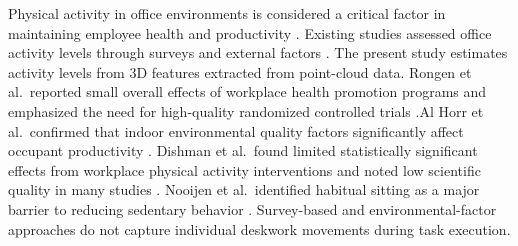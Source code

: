 Physical activity in office environments is considered a critical factor in maintaining employee health and productivity \cite{PAPAGIANNIDIS2020102027}.
Existing studies assessed office activity levels through surveys and external factors \cite{RONGEN2013406,ALHORR2016369,DISHMAN1998344,de2005effect}.
The present study estimates activity levels from 3D features extracted from point-cloud data.
Rongen et al.\ reported small overall effects of workplace health promotion programs and emphasized the need for high-quality randomized controlled trials \cite{RONGEN2013406}.Al Horr et al.\ confirmed that indoor environmental quality factors significantly affect occupant productivity \cite{ALHORR2016369}.
Dishman et al.\ found limited statistically significant effects from workplace physical activity interventions and noted low scientific quality in many studies \cite{DISHMAN1998344}.
Nooijen et al.\ identified habitual sitting as a major barrier to reducing sedentary behavior \cite{de2005effect}.
Survey-based and environmental-factor approaches do not capture individual deskwork movements during task execution.
